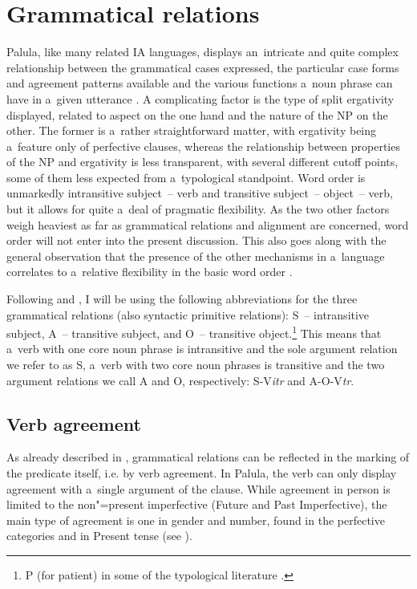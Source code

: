 \chapter{Grammatical relations}
\label{chap:11}

Palula, like many related IA languages, displays an~intricate and quite complex relationship between the grammatical cases expressed, the particular case forms and agreement patterns available and the various functions a~noun phrase can have in a~given utterance \citep[230--231]{masica1991}. A complicating factor is the type of split ergativity displayed, related to aspect on the one hand and the nature of the NP on the other. The former is a~rather straightforward matter, with ergativity being a~feature only of perfective clauses, whereas the relationship between properties of the NP and ergativity is less transparent, with several different cutoff points, some of them less expected from a~typological standpoint. Word order is unmarkedly intransitive subject~-- verb and transitive subject~-- object~-- verb, but it allows for quite a~deal of pragmatic flexibility. As the two other factors weigh heaviest as far as grammatical relations and alignment are concerned, word order will not enter into the present discussion. This also goes along with the general observation that the presence of the other mechanisms in a~language correlates to a~relative flexibility in the basic word order \citep[14--15]{blake_case_2001}.



Following \citet[6--8]{dixon1994} and \citet[110--116]{comrie1989}, I will be using the following abbreviations for the three grammatical relations (also syntactic primitive relations): S~-- intransitive subject, A~-- transitive subject, and O~-- transitive object.\footnote{P (for patient) in some of the typological literature \citep{comrie1989,croft2003}.\par } This means that a~verb with one core noun phrase is intransitive and the sole argument relation we refer to as S, a~verb with two core noun phrases is transitive and the two argument relations we call A and O, respectively: S-V\textit{itr} and A-O-V\textit{tr}.


\section{Verb agreement}
\label{sec:11-1}

As already described in , grammatical relations can be reflected in the marking of the predicate itself, i.e. by verb agreement. In Palula, the verb can only display agreement with a~single argument of the clause. While agreement in person is limited to the non"=present imperfective (Future and Past Imperfective), the main type of agreement is one in gender and number, found in the perfective categories and in Present tense (see ). 


